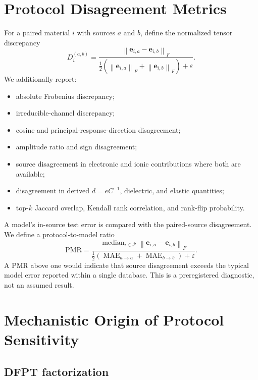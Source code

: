 \documentclass[11pt]{article}
\newcommand{\E}{\mathbf{e}}
\newcommand{\norm}[1]{\left\lVert #1 \right\rVert}
\begin{document}
\section{Protocol Disagreement Metrics}

For a paired material $i$ with sources $a$ and $b$, define the normalized tensor discrepancy
\begin{equation}
D_i^{(a,b)}
=
\frac{\norm{\E_{i,a}-\E_{i,b}}_F}
{\frac{1}{2}\left(\norm{\E_{i,a}}_F+\norm{\E_{i,b}}_F\right)+\varepsilon}.
\end{equation}
We additionally report:
\begin{itemize}[leftmargin=1.5em]
    \item absolute Frobenius discrepancy;
    \item irreducible-channel discrepancy;
    \item cosine and principal-response-direction disagreement;
    \item amplitude ratio and sign disagreement;
    \item source disagreement in electronic and ionic contributions where both are available;
    \item disagreement in derived $d=eC^{-1}$, dielectric, and elastic quantities;
    \item top-$k$ Jaccard overlap, Kendall rank correlation, and rank-flip probability.
\end{itemize}

A model's in-source test error is compared with the paired-source disagreement. We define a protocol-to-model ratio
\begin{equation}
\mathrm{PMR}
=
\frac{\operatorname{median}_{i\in\mathcal P}\norm{\E_{i,a}-\E_{i,b}}_F}
{\frac{1}{2}\left(
\operatorname{MAE}_{a\rightarrow a}
+
\operatorname{MAE}_{b\rightarrow b}
\right)+\varepsilon}.
\end{equation}
A PMR above one would indicate that source disagreement exceeds the typical model error reported within a single database. This is a preregistered diagnostic, not an assumed result.

\section{Mechanistic Origin of Protocol Sensitivity}

\subsection{DFPT factorization}
\end{document}
